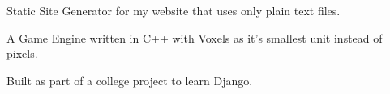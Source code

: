 \documentclass[]{resume-openfont}
\begin{document}
\begin{minipage}[t]{0.66\textwidth}
Static Site Generator for my website that uses only plain text files.\\
\sectionsep

A Game Engine written in C++ with Voxels as it's smallest unit instead of pixels. \\
\sectionsep

Built as part of a college project to learn Django.
\sectionsep


\end{minipage}
\end{document}
